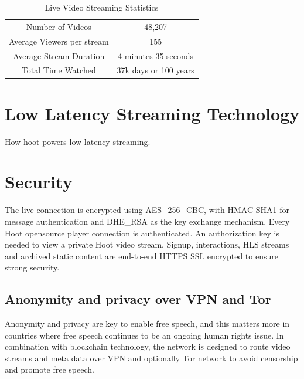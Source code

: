 \documentclass{article}
\begin{document}
\begin{table}[!htb]
\centering
\begin{tabular}{ |c|c| }
\hline
\rowcolor{lightgray} \multicolumn{2}{|c|}{Live Video Streaming Statistics} \\
\hline
Number of Videos & 48,207 \\
Average Viewers per stream & 155 \\
Average Stream Duration & 4 minutes 35 seconds \\
Total Time Watched & 37k days or 100 years \\
\hline
\end{tabular}
\caption{Live Video Streaming Statistics}
\label{table:2}
\end{table}



\section{Low Latency Streaming Technology}
How hoot powers low latency streaming.





\section{Security}
The live connection is encrypted using AES\_256\_CBC, with HMAC-SHA1 for message authentication and DHE\_RSA as the key exchange mechanism. Every Hoot opensource player connection is authenticated.
An authorization key is needed to view a private Hoot video stream. Signup, interactions, HLS streams and archived static content are end-to-end HTTPS  SSL encrypted to ensure strong security.    

\subsection{Anonymity and privacy over VPN and Tor}
Anonymity and privacy are key to enable free speech, and this matters
more in countries where free speech continues to be an ongoing human rights
issue. In combination with blockchain technology, the network is
designed to route video streams and meta data over VPN and optionally
Tor network to avoid censorship and promote free speech.
\end{document}
